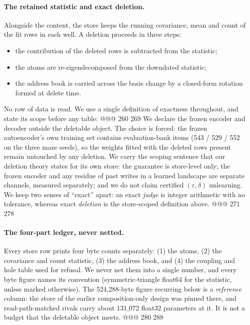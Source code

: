 \paragraph{The retained statistic and exact deletion.} Alongside the content, the store keeps
the running covariance, mean and count of the fit rows in each well. A deletion proceeds in
three steps:
\begin{itemize}[leftmargin=*,nosep]
\item the contribution of the deleted rows is subtracted from the statistic;
\item the atoms are re-eigendecomposed from the downdated statistic;
\item the address book is carried across the basis change by a closed-form rotation formed at
  delete time.
\end{itemize}
No row of data is read. We use a single definition of exactness throughout, and state its
scope before any table:
@@@ 260 269
\noindent We declare the frozen encoder and decoder outside the deletable object. The choice
is forced: the frozen autoencoder's own training set contains evaluation-bank items
(543 / 529 / 552 on the three maze seeds), so the weights fitted with the deleted rows present
remain untouched by any deletion. %
We carry the scoping sentence that our deletion theory states for its own store: the guarantee
is store-level only; the frozen encoder and any residue of past writes in a learned
landscape are separate channels, measured separately; and we do not claim certified
$(\varepsilon,\delta)$ unlearning. %
We keep two senses of ``exact'' apart: an exact \emph{judge} is integer arithmetic with no
tolerance, whereas exact \emph{deletion} is the store-scoped definition above.
@@@ 271 278
\paragraph{The four-part ledger, never netted.} Every store row prints four byte counts
separately: (1) the atoms, (2) the covariance and count statistic, (3) the address book, and
(4) the coupling and hole table used for refusal.
We never net them into a single number, and every byte figure names its convention
(symmetric-triangle float64 for the statistic, unless marked otherwise). The 524,288-byte figure
recurring below is a \emph{reference} column: the store of the earlier composition-only design
was pinned there, and read-path-matched rivals carry about 131,072 float32 parameters at it. %
It is not a budget that the deletable object meets.
@@@ 280 288
